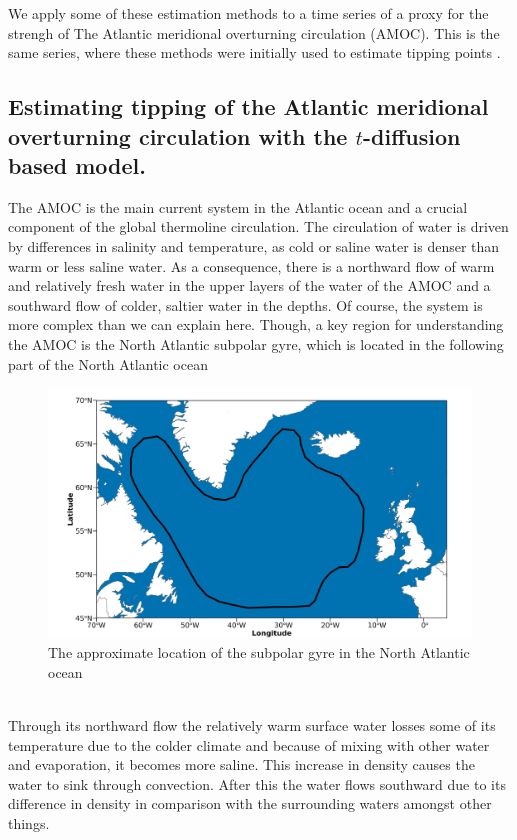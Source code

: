 We apply some of these estimation methods to a time series of a proxy for the strengh of The Atlantic meridional overturning circulation (AMOC). This is the same series,  where these methods were initially used to estimate tipping points \cite{Ditlevsen2023}.
\subsection{Estimating tipping of the Atlantic meridional overturning circulation with the \texorpdfstring{$t$}{t}-diffusion based model.}
The AMOC is the main current system in the Atlantic ocean and a crucial component of the global thermoline circulation. The circulation of water is driven by differences in salinity and temperature, as cold or saline water is denser than warm or less saline water. As a consequence, there is a northward flow of warm and relatively fresh water in the upper layers of the water of the AMOC and a southward flow of colder, saltier water in the depths. Of course, the system is more complex than we can explain here. Though, a key region for understanding the AMOC is the North Atlantic subpolar gyre, which is located in the following part of the North Atlantic ocean
\begin{figure}[h!]
    \begin{center}
        \includegraphics[scale = .175]{figures/NorthAtlanticOcean.jpeg}
    \end{center}
    \caption{The approximate location of the subpolar gyre in the North Atlantic ocean}
    \label{figure:subpolarGyre}
\end{figure}\\

Through its northward flow the relatively warm surface water losses some of its temperature due to the colder climate and because of mixing with other water and evaporation, it becomes more saline. This increase in density causes the water to sink through convection. After this the water flows southward due to its difference in density in comparison with the surrounding waters amongst other things.

